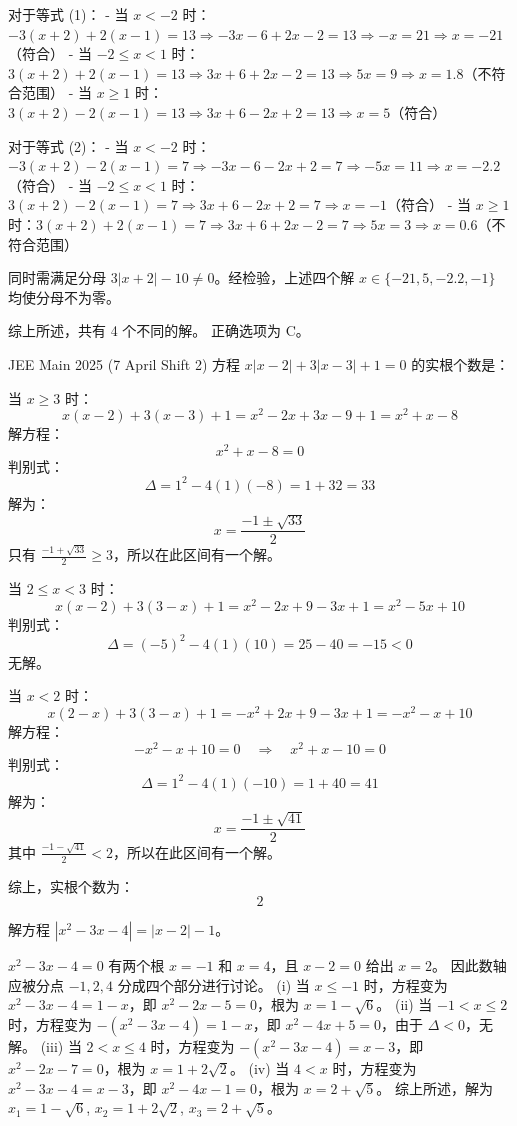 \begin{questions}
\begin{solution}
对于等式 (1)：
- 当 $x < -2$ 时：$-3(x+2) + 2(x-1) = 13 \Rightarrow -3x-6+2x-2=13 \Rightarrow -x=21 \Rightarrow x=-21$（符合）
- 当 $-2 \le x < 1$ 时：$3(x+2) + 2(x-1) = 13 \Rightarrow 3x+6+2x-2=13 \Rightarrow 5x=9 \Rightarrow x=1.8$（不符合范围）
- 当 $x \ge 1$ 时：$3(x+2) - 2(x-1) = 13 \Rightarrow 3x+6-2x+2=13 \Rightarrow x=5$（符合）

对于等式 (2)：
- 当 $x < -2$ 时：$-3(x+2) - 2(x-1) = 7 \Rightarrow -3x-6-2x+2=7 \Rightarrow -5x=11 \Rightarrow x=-2.2$（符合）
- 当 $-2 \le x < 1$ 时：$3(x+2) - 2(x-1) = 7 \Rightarrow 3x+6-2x+2=7 \Rightarrow x=-1$（符合）
- 当 $x \ge 1$ 时：$3(x+2) + 2(x-1) = 7 \Rightarrow 3x+6+2x-2=7 \Rightarrow 5x=3 \Rightarrow x=0.6$（不符合范围）

同时需满足分母 $3|x+2|-10 \neq 0$。经检验，上述四个解 $x \in \{-21, 5, -2.2, -1\}$ 均使分母不为零。

综上所述，共有 4 个不同的解。
正确选项为 C。
\end{solution}

\question JEE Main 2025 (7 April Shift 2)  
方程 \( x|x - 2| + 3|x - 3| + 1 = 0 \) 的实根个数是：
\begin{solution}
当 \(x \geq 3\) 时：
\[
x(x-2) + 3(x-3) + 1 = x^2 - 2x + 3x - 9 + 1 = x^2 + x - 8
\]
解方程：
\[
x^2 + x - 8 = 0
\]
判别式：
\[
\Delta = 1^2 - 4(1)(-8) = 1 + 32 = 33
\]
解为：
\[
x = \frac{-1 \pm \sqrt{33}}{2}
\]
只有 \(\frac{-1 + \sqrt{33}}{2} \geq 3\)，所以在此区间有一个解。

当 \(2 \leq x < 3\) 时：
\[
x(x-2) + 3(3-x) + 1 = x^2 - 2x + 9 - 3x + 1 = x^2 - 5x + 10
\]
判别式：
\[
\Delta = (-5)^2 - 4(1)(10) = 25 - 40 = -15 < 0
\]
无解。

当 \(x < 2\) 时：
\[
x(2-x) + 3(3-x) + 1 = -x^2 + 2x + 9 - 3x + 1 = -x^2 - x + 10
\]
解方程：
\[
-x^2 - x + 10 = 0 \quad \Rightarrow \quad x^2 + x - 10 = 0
\]
判别式：
\[
\Delta = 1^2 - 4(1)(-10) = 1 + 40 = 41
\]
解为：
\[
x = \frac{-1 \pm \sqrt{41}}{2}
\]
其中 \(\frac{-1 - \sqrt{41}}{2} < 2\)，所以在此区间有一个解。

综上，实根个数为：
\[
2
\]
\end{solution}

\question 解方程 $|x^2 - 3x - 4| = |x - 2| - 1$。

\begin{solution}
$x^2 - 3x - 4 = 0$ 有两个根 $x = -1$ 和 $x = 4$，且 $x - 2 = 0$ 给出 $x = 2$。
因此数轴应被分点 $-1, 2, 4$ 分成四个部分进行讨论。
(i) 当 $x \le -1$ 时，方程变为 $x^2 - 3x - 4 = 1 - x$，即 $x^2 - 2x - 5 = 0$，根为 $x = 1 - \sqrt{6}$。
(ii) 当 $-1 < x \le 2$ 时，方程变为 $-(x^2 - 3x - 4) = 1 - x$，即 $x^2 - 4x + 5 = 0$，由于 $\Delta < 0$，无解。
(iii) 当 $2 < x \le 4$ 时，方程变为 $-(x^2 - 3x - 4) = x - 3$，即 $x^2 - 2x - 7 = 0$，根为 $x = 1 + 2\sqrt{2}$。
(iv) 当 $4 < x$ 时，方程变为 $x^2 - 3x - 4 = x - 3$，即 $x^2 - 4x - 1 = 0$，根为 $x = 2 + \sqrt{5}$。
综上所述，解为 $x_1 = 1 - \sqrt{6}$, $x_2 = 1 + 2\sqrt{2}$, $x_3 = 2 + \sqrt{5}$。
\end{solution}

\end{questions}
\pagebreak

